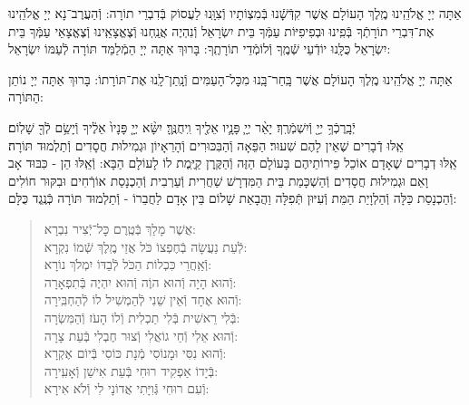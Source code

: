 \documentclass[twoside, openany, parskip=half, 11pt]{book}
\begin{document}
אַתָּה יְיָ אֱלֹהֵֽינוּ מֶֽלֶךְ הָעוֹלָם אֲשֶׁר קִדְּֿשָֽֿׁנוּ בְּֿמִצְוֹתָיו וְֿצִוָּֽנוּ לַעֲסוֹק בְּֿדִבְרֵי תוֹרָה: וְֿהַעֲרֶב־נָא יְיָ אֱלֹהֵֽינוּ אֶת־דִּבְרֵי תוֹרָתְֿךָ בְּֿפִֽינוּ וּבְפִיפִיּוֹת עַמְּֿךָ בֵּית יִשְׂרָאֵל וְֿנִהְיֶה אֲנַֽחְנוּ וְֿצֶאֱצָאֵֽינוּ וְֿצֶאֱצָאֵי עַמְּֿךָ בֵּית יִשְׂרָאֵל כֻּלָּֽנוּ יוֹדְֿעֵי שְֿׁמֶֽךָ וְֿלוֹמְֿדֵי תוֹרָתֶֽךָ: בָּרוּךְ אַתָּה יְיָ הַמְֿלַמֵּד תּוֹרָה לְֿעַמּוֹ יִשְׂרָאֵל:

אַתָּה יְיָ אֱלֹהֵֽינוּ מֶֽלֶךְ הָעוֹלָם אֲשֶׁר בָּֽחַר־בָּֽנוּ מִכׇּל־הָעַמִּים וְֿנָֽתַן־לָֽנוּ אֶת־תּוֹרָתוֹ: בָּרוּךְ אַתָּה יְיָ נוֹתֵן הַתּוֹרָה:



יְֿבָֽרֶכְֿךָ֥ יְיָ֖ וְֿיִשְׁמְֿרֶֽךָ׃ יָאֵ֨ר יְיָ֧ פָּנָ֛יו אֵלֶ֖יךָ וִֽיחֻנֶּֽךָּ׃ יִשָּׂ֨א יְיָ֤ פָּנָיו֙ אֵלֶ֔יךָ וְֿיָשֵׂ֥ם לְֿךָ֖ שָׁלֽוֹם׃\\
אֵֽלּוּ דְֿבָרִים שֶׁאֵין לָהֶם שִׁעוּר׃ הַפֵּאָה וְֿהַבִּכּוּרִים וְֿהָרֵאָיוֹן וּגְמִילוּת חֲסָדִים וְֿתַלְמוּד תּוֹרָה׃\\
אֵֽלּוּ דְבָרִים שֶׁאָדָם אוֹכֵל פֵּירוֹתֵיהֶם בָּעוֹלָם הַזֶּה וְֿהַקֶּֽרֶן קַיֶּֽמֶת לוֹ לָעוֹלָם הַבָּא: וְֿאֵֽלּוּ הֵן - כִּבּוּד אָב וָאֵם וּגְמִילוּת חֲסָדִים וְֿהַשְׁכָּמַת בֵּית הַמִּדְרָשׁ שַׁחֲרִית וְֿעַרְבִית וְֿהַכְנָסַת אוֹרְֿחִים וּבִקּוּר חוֹלִים וְֿהַכְנָסַת כַּלָּה וְֿהַלְוָיַת הַמֵּת וְֿעִיּוּן תְּֿפִלָּה וַהֲבָאַת שָׁלוֹם בֵּין אָדָם לַחֲבֵרוֹ - וְֿתַלְמוּד תּוֹרָה כְּֿנֶֽגֶד כֻּלָּם:





\begin{quote}

אֲשֶׁר מָלַךְ \hfill בְּֿטֶֽרֶם כׇּל־יְֿצִיר נִבְרָא: \\
לְֿעֵת נַעֲשָׂה בְֿחֶפְצוֹ כֹּל \hfill אֲזַי מֶֽלֶךְ שְֿׁמוֹ נִקְרָא:\\
וְֿאַֽחֲרֵי כִּכְלוֹת הַכֹּל \hfill לְֿבַדּוֹ יִמְלֹךְ נוֹרָא: \\
וְֿהוּא הָיָה וְֿהוּא הוֶֹה \hfill וְֿהוּא יִהְיֶה בְּֿתִפְאָרָה: \\
וְֿהוּא אֶחָד וְֿאֵין שֵׁנִי \hfill לְֿהַמְשִׁיל לוֹ לְֿהַחְבִּֽירָה: \\
בְּֿלִי רֵאשִׁית בְּֿלִי תַכְלִית \hfill וְֿלוֹ הָעֹז וְֿהַמִּשְׂרָה: \\
וְֿהוּא אֵלִי וְֿחַי גוֹאֲלִי \hfill וְֿצוּר חֶבְלִי בְּֿעֵת צָרָה: \\
וְֿהוּא נִסִּי וּמָנוֹסִי \hfill מְֿנָת כּוֹסִי בְּֿיוֹם אֶקְרָא: \\
בְּֿיָדוֹ אַפְקִיד רוּחִי \hfill בְּֿעֵת אִישַׁן וְֿאָעִֽירָה: \\
וְֿעִם רוּחִי גְּֿוִיָּתִי \hfill אֲדוֹנָי לִי וְֿלֹא אִירָא:

\end{quote}
\end{document}
